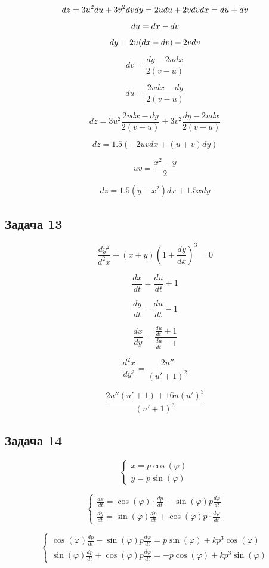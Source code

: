 \documentclass[a4paper,12pt]{article}
\begin{document}
\[
dz = 3u^2du + 3v^2dv \\
dy = 2udu + 2vdv \\
dx = du + dv 
\]

\[
du = dx - dv \\
\]

\[
dy = 2u(dx-dv) + 2vdv \\
\]

\[
dv = \frac{dy-2udx}{2(v-u)}
\]

\[
du = \frac{2vdx - dy}{2(v-u)}
\]

\[
dz = 3u^2\frac{2vdx - dy}{2(v-u)} + 3v^2\frac{dy-2udx}{2(v-u)}
\]

\[
dz = 1.5(-2uvdx+(u+v)dy)
\]

\[
uv=\frac{x^2-y}{2}
\]

\[
dz = 1.5(y-x^2)dx + 1.5xdy 
\]

\subsection{Задача 13}

\[
\frac{dy^2}{d^2x} + (x+y)(1+\frac{dy}{dx})^3 = 0
\]

\[
\frac{dx}{dt} = \frac{du}{dt} +1
\]

\[
\frac{dy}{dt} = \frac{du}{dt} -1
\]

\[
\frac{dx}{dy} = \frac{\frac{du}{dt}+1}{\frac{du}{dt}-1}
\]

\[
\frac{d^2x}{dy^2} = \frac{2u''}{(u'+1)^2}
\]

\[
\frac{2u''(u'+1)+16u(u')^3}{(u'+1)^3}
\]

\subsection{Задача 14}

\[
\begin{cases}
    x = p\cos(\varphi) \\
    y = p \sin(\varphi)
\end{cases}
\]

\[  
\begin{cases}
    \frac{dx}{dt} = \cos(\varphi) \cdot \frac{dp}{dt} - \sin(\varphi)p\frac{d\varphi}{dt} \\
    \frac{dy}{dt} = \sin(\varphi)\frac{dp}{dt} + \cos(\varphi) p \cdot \frac{d\varphi}{dt}
\end{cases}
\]

\[
\begin{cases}
    \cos(\varphi)\frac{dp}{dt} - \sin(\varphi)p\frac{d\varphi}{dt} = p\sin(\varphi)+kp^3\cos(\varphi)\\
    \sin(\varphi)\frac{dp}{dt} + \cos(\varphi)p\frac{d\varphi}{dt} = -p\cos(\varphi)+kp^3\sin(\varphi)
\end{cases}
\]
\end{document}
